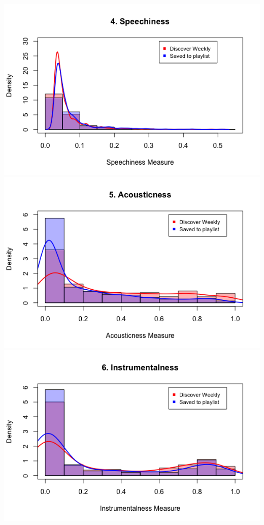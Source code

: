 \documentclass{article}
\begin{document}
		\includegraphics[width=\textwidth]{4_speechiness}\\
		\includegraphics[width=\textwidth]{5_acousticness}\\
		\includegraphics[width=\textwidth]{6_instrumentalness}\\
\end{document}
